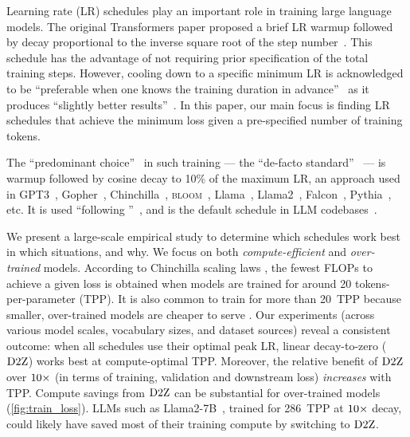 Learning rate (LR) schedules play an important role in training large
language models.  The original Transformers paper proposed a brief LR
warmup followed by decay proportional to the inverse square root of
the step number~\citep{vaswani2017attention}.
%
%
This schedule has the advantage of not requiring prior specification
of the total training steps.  However, cooling down to a specific
minimum LR is acknowledged to be ``preferable when one knows the
training duration in advance''~\citep{zhai2022scaling} as it produces
``slightly better results''~\citep{raffel2020exploring}.
%
In this paper, our main focus is finding LR schedules that achieve the
minimum loss given a pre-specified number of training tokens.

The ``predominant choice''~\citep{hu2024minicpm} in such training ---
the ``de-facto standard''~\citep{hagele2024scaling} ---
%
is warmup followed by cosine decay to 10\% of the maximum LR, an
approach used in GPT3~\citep{brown2020language},
Gopher~\citep{rae2022scaling},
Chinchilla~\citep{hoffmann2022empirical},
\textsc{bloom}~\citep{lescao2023bloom}, Llama~\citep{touvron2023llama},
Llama2~\citep{touvron2023llama2}, Falcon~\citep{almazrouei2023falcon},
Pythia~\citep{biderman2023pythia}, etc.
%
It is used ``following \citeauthor{hoffmann2022empirical}''~\citep{muennighoff2023scaling}, and is the default schedule in
LLM codebases~\citep{karpathy2024nanogpt}.



We present a large-scale empirical study to determine which schedules
work best in which situations, and why.
%
We focus on both \emph{compute-efficient} and \emph{over-trained}
models.  According to Chinchilla scaling
laws \citep{hoffmann2022empirical}, the fewest FLOPs to achieve a
given loss is obtained when models are trained for around 20
tokens-per-parameter (TPP).  It is also common to train for more than
20~TPP because smaller, over-trained models are cheaper to
serve \citep{touvron2023llama}.
Our experiments (across various model scales, vocabulary sizes, and
dataset sources) reveal a consistent outcome: when all schedules use
their optimal peak LR, linear decay-to-zero ($\mbox{D2Z}$) works best at
compute-optimal TPP\@.
%
Moreover, the relative benefit of $\mbox{D2Z}$ over $\mbox{10}\times$ (in terms of
training, validation and downstream loss) \emph{increases} with TPP\@.
%
Compute savings from $\mbox{D2Z}$ can be substantial for over-trained
models (\cref{fig:train_loss}).
%
LLMs such as Llama2-7B~\citep{touvron2023llama2}, trained for 286~TPP
at $\mbox{10}\times$ decay, could likely have saved most of their training
compute by switching to $\mbox{D2Z}$.

